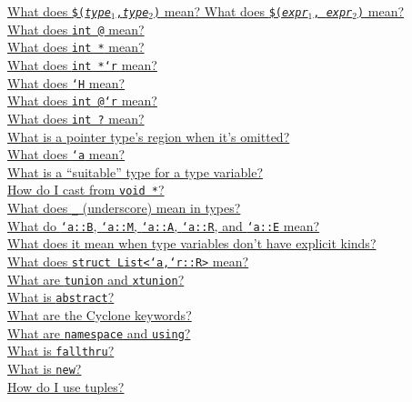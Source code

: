 \ifscreen
\begin{small}
\hyperlink{faq:tuple}{What does \texttt{\$({\it type}$_1$,{\it type}$_2$)} mean?  What does \texttt{\$({\it expr}$_1$, {\it expr}$_2$)} mean?}\\
\hyperlink{faq:non-null}{What does \texttt{int @} mean?}\\
\hyperlink{faq:bounds}{What does \texttt{int *\rb} mean?}\\
\hyperlink{faq:region}{What does \texttt{int *`r} mean?}\\
\hyperlink{faq:heapregion}{What does \texttt{`H} mean?}\\
\hyperlink{faq:boundsregion}{What does \texttt{int @\rb `r} mean?}\\
\hyperlink{faq:questionable}{What does \texttt{int ?} mean?}\\
\hyperlink{faq:omitregion}{What is a pointer type's region when it's omitted?}\\
\hyperlink{faq:typevar}{What does \texttt{`a} mean?}\\
\hyperlink{faq:suitable}{What is a ``suitable'' type for a type variable?}\\
\hyperlink{faq:voidstar}{How do I cast from \texttt{void *}?}\\
\hyperlink{faq:uscore-types}{What does \texttt{_} (underscore) mean in types?}\\
\hyperlink{faq:kinds}{What do \texttt{`a::B}, \texttt{`a::M}, \texttt{`a::A}, \texttt{`a::R}, and \texttt{`a::E} mean?}\\
\hyperlink{faq:nokinds}{What does it mean when type variables don't have explicit kinds?}\\
\hyperlink{faq:list}{What does \texttt{struct List<`a,`r::R>} mean?}\\
\hyperlink{faq:tagged}{What are \texttt{tunion} and \texttt{xtunion}?}\\
\hyperlink{faq:abstract}{What is \texttt{abstract}?}\\
\hyperlink{faq:keywords}{What are the Cyclone keywords?}\\
\hyperlink{faq:namespace}{What are \texttt{namespace} and \texttt{using}?}\\
\hyperlink{faq:fallthru}{What is \texttt{fallthru}?}\\
\hyperlink{faq:new}{What is \texttt{new}?}\\
\hyperlink{faq:usetuples}{How do I use tuples?}\\

\end{small}
